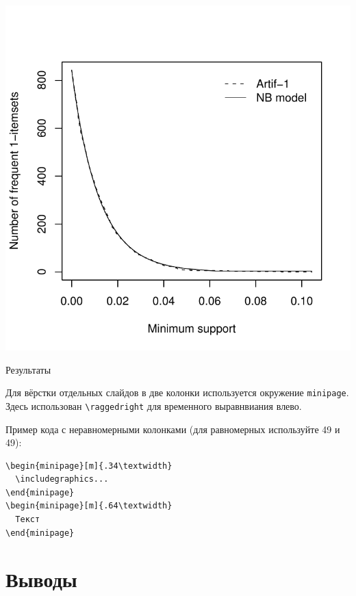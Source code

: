 \documentclass[12pt]{article}
\begin{document}
\begin{minipage}[m]{.34\textwidth}
\includegraphics[width=\textwidth]{sample-image}
\centerline{Результаты}
\end{minipage}
%
\begin{minipage}[m]{.65\textwidth}
\raggedright
Для вёрстки отдельных слайдов в две колонки используется окружение
  \verb+minipage+. Здесь использован \verb+\raggedright+ для временного выравнвиания влево.

Пример кода с неравномерными колонками (для равномерных используйте 49 и 49):

\begin{verbatim}
\begin{minipage}[m]{.34\textwidth}
  \includegraphics...
\end{minipage}
\begin{minipage}[m]{.64\textwidth}
  Текст
\end{minipage}
\end{verbatim}

\end{minipage}

\section{Выводы}
\end{document}
